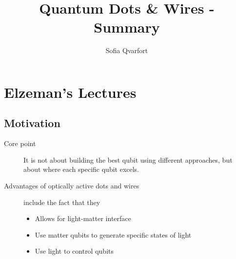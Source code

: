 


\title{Quantum Dots \& Wires - Summary}
\author{Sofia Qvarfort}
\maketitle

\section{Elzeman's Lectures}
\subsection{Motivation}
\begin{description}
\item[Core point] It is not about building the best qubit using different approaches, but about where each specific qubit excels. 

\item[Advantages of optically active dots and wires]  include the fact that they
\begin{itemize}
\item Allows for light-matter interface 
\item Use matter qubits to generate specific states of light
\item Use light to control qubits
\end{itemize}

\end{description}
